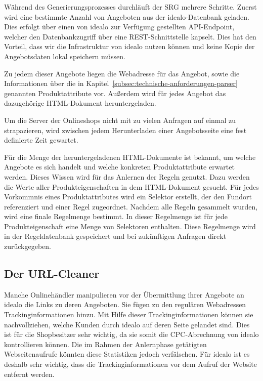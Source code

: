 Während des Generierungsprozesses durchläuft der SRG mehrere Schritte.
Zuerst wird eine bestimmte Anzahl von Angeboten aus der idealo-Datenbank geladen.
Dies erfolgt über einen von idealo zur Verfügung gestellten API-Endpoint, welcher den Datenbankzugriff über eine
REST-Schnittstelle kapselt.
Dies hat den Vorteil, dass wir die Infrastruktur von idealo nutzen können und keine Kopie der Angebotsdaten
lokal speichern müssen.

Zu jedem dieser Angebote liegen die Webadresse für das Angebot, sowie die  Informationen über die in
Kapitel~\ref{subsec:technische-anforderungen-parser} genannten Produktattribute vor.
Außerdem wird für jedes Angebot das dazugehörige HTML-Dokument heruntergeladen.

Um die Server der Onlineshops nicht mit zu vielen Anfragen auf einmal zu strapazieren, wird zwischen jedem
Herunterladen einer Angebotsseite eine fest definierte Zeit gewartet.

Für die Menge der heruntergeladenen HTML-Dokumente ist bekannt, um welche Angebote es sich handelt und welche
konkreten Produktattribute erwartet werden.
Dieses Wissen wird für das Anlernen der Regeln genutzt.
Dazu werden die Werte aller Produkteigenschaften in dem HTML-Dokument gesucht.
Für jedes Vorkommnis eines Produktattributes wird ein Selektor erstellt, der den Fundort referenziert und einer Regel
zugeordnet.
Nachdem alle Regeln gesammelt wurden, wird eine finale Regelmenge bestimmt.
In dieser Regelmenge ist für jede Produkteigenschaft eine Menge von Selektoren enthalten.
Diese Regelmenge wird in der Regeldatenbank gespeichert und bei zukünftigen Anfragen direkt zurückgegeben.

\subsection{Der URL-Cleaner}
\label{subsec:urlcleaner}

Manche Onlinehändler manipulieren vor der Übermittlung ihrer Angebote an idealo die Links zu deren Angeboten.
Sie fügen zu den regulären Webadressen Trackinginformationen hinzu.
Mit Hilfe dieser Trackinginformationen können sie nachvollziehen, welche Kunden durch idealo auf deren Seite gelandet
sind.
Dies ist für die Shopbesitzer sehr wichtig, da sie somit die CPC-Abrechnung von idealo kontrollieren können.
Die im Rahmen der Anlernphase getätigten Webseitenaufrufe könnten diese Statistiken jedoch verfälschen.
Für idealo ist es deshalb sehr wichtig, dass die Trackinginformationen vor dem Aufruf der Website entfernt werden.

